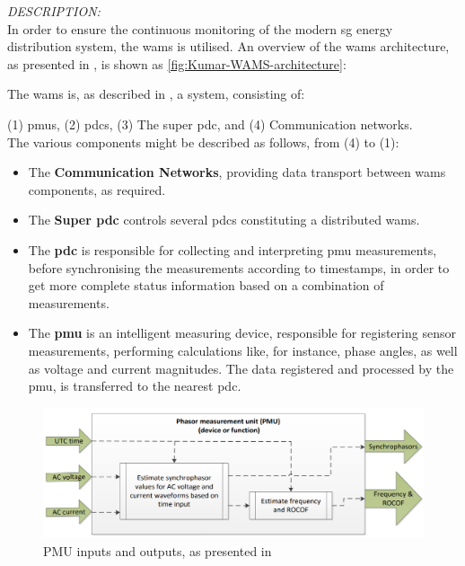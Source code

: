 \textit{DESCRIPTION:}
\textbf{\cite{kumar2015monitoring}  }\\


    

In order to ensure the continuous monitoring of the modern \acrlong{sg} energy distribution system, the \acrfull{wams} is utilised. An overview of the \acrshort{wams} architecture, as presented in   \cite{kumar2015monitoring}, is shown as \figureautorefname  { } \ref{fig:Kumar-WAMS-architecture}:

The \acrshort{wams} is, as described in  \cite{kumar2015monitoring}, a  system, consisting of:

(1) \acrshort{pmu}s, (2) \acrshort{pdc}s, (3) The super \acrshort{pdc}, and (4) Communication networks.\\ 

The various components might be described as follows, from (4) to (1):
\begin{itemize}
    \item The \textbf{Communication Networks}, providing data transport between \acrshort{wams} components, as required.
    \item The \textbf{Super \acrshort{pdc}} controls several \acrshort{pdc}s constituting a distributed \acrshort{wams}.
\item The \textbf{\acrfull{pdc}} is responsible for collecting and interpreting \acrshort{pmu} measurements, before synchronising the measurements according to timestamps, in order to get more complete status information based on a combination of measurements.
    \item The \textbf{\acrfull{pmu}} is an intelligent measuring device, responsible for registering sensor measurements,  performing calculations like, for instance, phase angles, as well as voltage and current magnitudes. The data registered and processed by the \acrshort{pmu}, is transferred to the nearest \acrshort{pdc}.
    \end{itemize}

\begin{figure}[ht]
\includegraphics[width=\linewidth]{figures/PMU-in-out.png}
\caption[PMU inputs and outputs]{PMU inputs and outputs, as presented in \Cite[p.12]{iec2018measuring}
}
\label{fig:PMU-in-out}
\end{figure}


